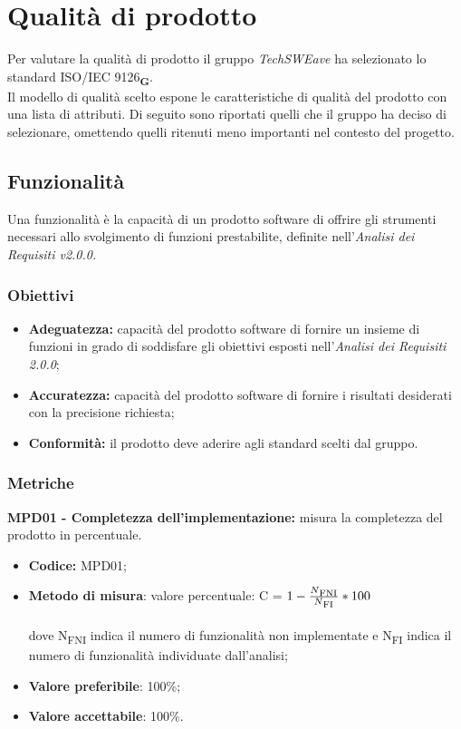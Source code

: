 \section{Qualità di prodotto}
Per valutare la qualità di prodotto il gruppo  \textit{TechSWEave} ha selezionato lo standard ISO/IEC 9126\textsubscript{\textbf{G}}.\\
Il modello di qualità scelto espone le caratteristiche di qualità del prodotto con una lista di attributi. Di seguito sono riportati quelli che il 
gruppo ha deciso di selezionare, omettendo quelli ritenuti meno importanti nel contesto del progetto.
\subsection{Funzionalità}
Una funzionalità è la capacità di un prodotto software di offrire gli strumenti necessari allo svolgimento di funzioni prestabilite, definite 
nell'\textit{Analisi dei Requisiti v2.0.0.}
\subsubsection{Obiettivi}
\begin{itemize}
    \item \textbf{Adeguatezza:} capacità del prodotto software di fornire un insieme di funzioni in grado
    di soddisfare gli obiettivi esposti nell’\textit{Analisi dei Requisiti 2.0.0};
    \item \textbf{Accuratezza:} capacità del prodotto software di fornire i risultati desiderati con la precisione richiesta;
    \item \textbf{Conformità:} il prodotto deve aderire agli standard scelti dal gruppo.
\end{itemize}
\subsubsection{Metriche}
\textbf{MPD01 - Completezza dell'implementazione:} misura la completezza del prodotto in percentuale.
\begin{itemize}
    \item \textbf{Codice:} MPD01;
    \item \textbf{Metodo di misura}: valore percentuale: C = $1-\frac{N\textsubscript{FNI}}{N\textsubscript{FI}}*100$ \\
    \\dove N\textsubscript{FNI} indica il numero di funzionalità non implementate e N\textsubscript{FI} indica il numero di funzionalità 
    individuate dall'analisi;
    \item \textbf{Valore preferibile}: 100\%;
    \item \textbf{Valore accettabile}: 100\%.
\end{itemize}
